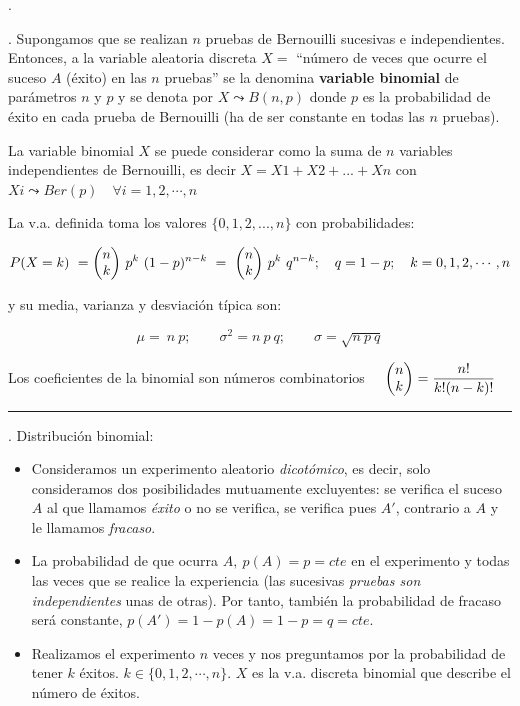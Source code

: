 \textbf{\Large{}}\normalsize{.}

\begin{definition}
.	Supongamos que se realizan $n$ pruebas de Bernouilli sucesivas e independientes. Entonces, a la variable aleatoria discreta
$X =$ ``número de veces que ocurre el suceso $A$ (éxito) en las $n$ pruebas''
se la denomina \textbf{variable binomial} de parámetros $n$ y $p$ y se denota por $X \leadsto B(n, p)$ donde $p$ es la probabilidad de  éxito en cada prueba de Bernouilli (ha de ser constante en todas las $n$ pruebas). 

\vspace{2mm} \textcolor{gris}{  La variable binomial $X$ se puede considerar como la suma de $n$ variables independientes de Bernouilli, es decir $X=X1+X2+...+Xn$ con $Xi \leadsto Ber(p)\quad \forall i=1,2,\cdots ,n$}

\vspace{2mm}  La v.a. definida toma los valores $\{0, 1, 2, ..., n\}$ con probabilidades:

$$P (X = k) \ = \mqty(n \\ k) \ p^k \ (1-p)^{n-k} \ = \   \mqty(n \\ k) \ p^k \ q^{n-k} ;\quad q=1-p; \quad k=0,1,2,\cdots ,n$$

y su media, varianza y desviación típica son:

$$ \mu = \ n \ p;\qquad \sigma^2 = n\ p \ q ; \qquad \sigma = \sqrt{n\ p\ q}$$

\textcolor{gris}{Los coeficientes de la binomial son números combinatorios $\quad \mqty(n\\ k)= \dfrac {n!}{k! (n-k)!}$}	

\rule{150pt}{0.1pt}

.	Distribución binomial:

\begin{itemize}
\item Consideramos un experimento aleatorio \emph{dicotómico}, es decir, solo consideramos dos posibilidades mutuamente excluyentes: se verifica el suceso $A$ al que llamamos \emph{éxito} o no se verifica, se verifica pues $A'$, contrario a $A$ y le llamamos \emph{fracaso}.
\item La probabilidad de que ocurra $A,\ p(A)=p=cte$ en el experimento y todas las veces que se realice la experiencia (las sucesivas \emph{pruebas son independientes} unas de otras). Por tanto, también la probabilidad de fracaso será constante, $p(A')=1-p(A)=1-p=q=cte$.
\item Realizamos el experimento $n$ veces y nos preguntamos por la probabilidad de tener $k$ éxitos. $k\in \{0,1,2,\cdots, n\}$. $X$ es la v.a. discreta binomial que describe el número de éxitos.	
\end{itemize}
	

\end{definition}
